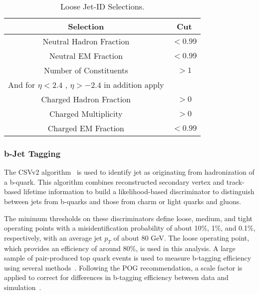 \begin{table}[ht]
\begin{center}
 \caption{Loose Jet-ID Selections.\label{tab:jetId}}
 \begin{tabular}{|cc|}
 \hline\hline
       Selection                        & Cut        \\[0.5ex] \hline
       Neutral Hadron Fraction          & $<0.99$      \\
       Neutral EM Fraction              & $<0.99$      \\
       Number of Constituents           & $> 1$        \\
       And for $\eta < 2.4$ , $\eta > -2.4$ in addition apply &\\
       Charged Hadron Fraction 	        & $> 0$   \\
       Charged Multiplicity             & $> 0$   \\
       Charged EM Fraction              & $<0.99$ \\
 \hline
 \hline
 \end{tabular}
\end{center}
\end{table}


\subsubsection{b-Jet Tagging}

The CSVv2 algorithm~\cite{Chatrchyan:2012jua} is used to identify jet as originating from hadronization of a b-quark. This algorithm combines 
reconstructed secondary vertex and track-based lifetime information to build a likelihood-based discriminator to distinguish between jets from b-quarks and those 
from charm or light quarks and gluons.

The minimum thresholds on these discriminators define loose, medium, and tight operating points with a misidentification probability of about 10\%, 1\%, and 
0.1\%, respectively, with an average jet $p_T$ of about 80 GeV. The loose operating point, which provides an efficiency of around 80\%, is used in this analysis.
A large sample of pair-produced top quark events is used to measure b-tagging efficiency using several methods~\cite{CMS-PAS-BTV-13-001}. 
Following the POG recommendation, a scale factor is applied to correct for differences in b-tagging efficiency between data and simulation~\cite{bTagging}.
